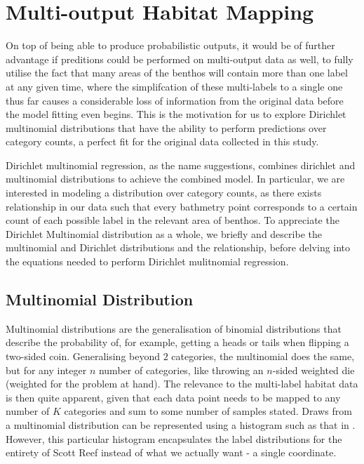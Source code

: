 \chapter{Multi-output Habitat Mapping} \label{chap:dms}
On top of being able to produce probabilistic outputs, it would be of further advantage if preditions could be performed on multi-output data as well, to fully utilise the fact that many areas of the benthos will contain more than one label at any given time, where the simplifcation of these multi-labels to a single one thus far causes a considerable loss of information from the original data before the model fitting even begins. This is the motivation for us to explore Dirichlet multinomial distributions that have the ability to perform predictions over category counts, a perfect fit for the original data collected in this study.

Dirichlet multinomial regression, as the name suggestions, combines dirichlet and multinomial distributions to achieve the combined model. In particular, we are interested in modeling a distribution over category counts, as there exists relationship in our data such that every bathmetry point corresponds to a certain count of each possible label in the relevant area of benthos. To appreciate the Dirichlet Multinomial distribution as a whole, we briefly and describe the multinomial and Dirichlet distributions and the relationship, before delving into the equations needed to perform Dirichlet mulitnomial regression.


\section{Multinomial Distribution}
Multinomial distributions are the generalisation of binomial distributions that describe the probability of, for example, getting a heads or tails when flipping a two-sided coin. Generalising beyond $2$ categories, the multinomial does the same, but for any integer $n$ number of categories, like throwing an $n$-sided weighted die (weighted for the problem at hand). The relevance to the multi-label habitat data is then quite apparent, given that each data point needs to be mapped to any number of $K$ categories and sum to some number of samples stated. Draws from a multinomial distribution can be represented using a histogram such as that in . However, this particular histogram encapsulates the label distributions for the entirety of Scott Reef instead of what we actually want - a single coordinate.

